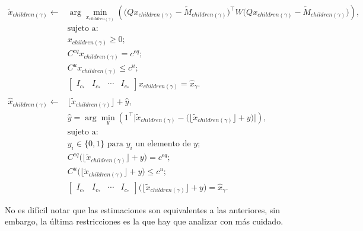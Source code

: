 \documentclass[informe]{upropuesta}
\begin{document}
\begin{equation} \label{eq:optimization}
    \begin{aligned}
        \tilde{x}_{\mathit{children}(\gamma)} \leftarrow &\arg\min_{x_{\mathit{children}(\gamma)}} 
        \left( \big(Qx_{\mathit{children}(\gamma)} - \widetilde{M}_{\mathit{children}(\gamma)}\big)^\top 
        W \big(Qx_{\mathit{children}(\gamma)} - \widetilde{M}_{\mathit{children}(\gamma)}\big) \right), \\
        &\text{sujeto a:} \\
        &x_{\mathit{children}(\gamma)} \geq 0; \\
        &C^{eq}x_{\mathit{children}(\gamma)} = c^{eq}; \\
        &C^u x_{\mathit{children}(\gamma)} \leq c^u; \\
        &\begin{bmatrix}
            I_{c_*} & I_{c_*} & \cdots & I_{c_*}
        \end{bmatrix} x_{\mathit{children}(\gamma)} = \hat{x}_\gamma. \\
        \\
        \hat{x}_{\mathit{children}(\gamma)} \leftarrow &\lfloor \tilde{x}_{\mathit{children}(\gamma)} \rfloor + \hat{y}, \\
        &\hat{y} = \arg\min_{y} \left( 1^\top \big|\tilde{x}_{\mathit{children}(\gamma)} - \big( \lfloor \tilde{x}_{\mathit{children}(\gamma)} \rfloor + y \big) \big| \right), \\
        &\text{sujeto a:} \\
        &y_i \in \{0, 1\} \text{ para } y_i \text{ un elemento de } y; \\
        &C^{eq} \big( \lfloor \tilde{x}_{\mathit{children}(\gamma)} \rfloor + y \big) = c^{eq}; \\
        &C^u \big( \lfloor \tilde{x}_{\mathit{children}(\gamma)} \rfloor + y \big) \leq c^u; \\
        &\begin{bmatrix}
            I_{c_*} & I_{c_*} & \cdots & I_{c_*}
        \end{bmatrix}
        \big( \lfloor \tilde{x}_{\mathit{children}(\gamma)} \rfloor + y \big) = \hat{x}_\gamma.
    \end{aligned}
\end{equation}

No es difícil notar que las estimaciones son equivalentes a las anteriores, sin embargo, la última restricciones es la que hay que analizar con más cuidado. 
\end{document}
